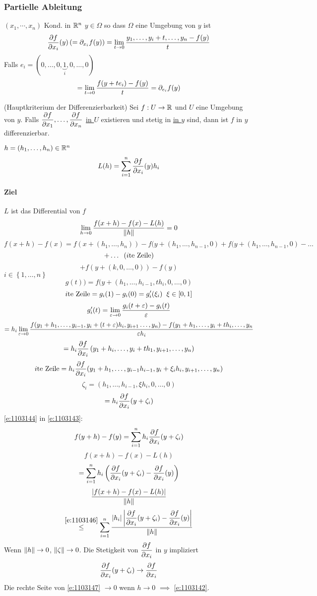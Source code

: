 \subsubsection{Partielle Ableitung}
$(x_1,\cdots,x_n)$ Kond. in $\mathbb{R}^n$ $y\in \Omega$ so dass $\Omega$ eine Umgebung von $y$ ist
\[\dfrac{\partial f}{\partial x_i}(y)\left( =\partial_{x_i}f(y) \right)=\displaystyle\lim_{t\rightarrow0}\frac{y_1,\dots,y_i+t,\dots,y_n-f(y)}{t}\]
Falls $e_i=(0,\dots,0,\underbrace{1}_i,0,\dots,0)$
\[=\displaystyle\lim_{t\rightarrow0}\frac{f(y+te_i)-f(y)}{t}=\partial_{e_i}f(y)\]
\begin{Sat}
  (Hauptkriterium der Differenzierbarkeit) Sei $f:U\rightarrow \mathbb{R}$ und $U$ eine Umgebung von $y$. Falls $\dfrac{\partial f}{\partial x_1},\dots,\dfrac{\partial f}{\partial x_n}$ \ul{in $U$} existieren und stetig in \ul{in $y$} sind, dann ist $f$ in $y$ differenzierbar.
\end{Sat}
\begin{Bew}
  $h=(h_1,\dots,h_n)\in\mathbb{R}^n$
  \[L(h)=\sum^n_{i=1}\dfrac{\partial f}{\partial x_i}(y)h_i\]
  \paragraph{Ziel} $L$ ist das Differential von $f$
  \[\displaystyle\lim_{h\rightarrow0}\frac{f(x+h)-f(x)-L(h)}{\left\| h \right\|}=0\]
  \[f(x+h)-f(x)=f(x+(h_1,\dots,h_n))-f(y+(h_1,\dots,h_{n-1},0)+f(y+(h_1,\dots,h_{n-1}, 0)-\dots\]
  \[+\dots\hspace{2mm}(\text{$i$te Zeile})\]
  \begin{equation}
    \label{e:1103143}
    +f(y+(k,0,\dots,0))-f(y)
  \end{equation}
  $i\in\left\{ 1,\dots,n \right\}$
  \[g(t))=f(y+(h_1,\dots,h_{i-1},th_i,0,\dots,0)\]
  \[\text{$i$te Zeile}=g_i(1)-g_i(0)=g_i'(\xi_i)\hspace{2mm}\xi\in \left[ 0,1 \right]\]
  \[g_i'(t)=\displaystyle\lim_{\varepsilon\rightarrow0}\frac{g_i(t+\varepsilon)-g_i(t)}{\varepsilon}\]
  \[=h_i\displaystyle\lim_{\varepsilon\rightarrow0}\frac{f(y_1+h_1,\dots,y_{i-1},y_i+(t+\varepsilon)h_i,y_{i+1}\dots,y_n)-f(y_1+h_1,\dots,y_i+th_i,\dots,y_n}{\varepsilon h_i}\]
  \[=h_i\dfrac{\partial f}{\partial x_i}\left( y_1+h_i,\dots,y_i+th_1,y_{i+1},\dots,y_n \right)\]
  \[\text{$i$te Zeile}=h_i\dfrac{\partial f}{\partial x_i}(y_1+h_1,\dots,y_{i-1}h_{i-1},y_i+\xi_ih_i,y_{i+1},\dots,y_n)\]
  \[\zeta_i=\left( h_1,\dots,h_{i-1},\xi h_i,0,\dots,0 \right)\]
  \begin{equation}
    \label{e:1103144}
    =h_i\dfrac{\partial f}{\partial x_i}(y+\zeta_i)
  \end{equation}
  \ref{e:1103144} in \ref{e:1103143}:
  \begin{equation}
    \label{e:1103145}
    f(y+h)-f(y)=\sum_{i=1}^nh_i\dfrac{\partial f}{\partial x_i}(y+\zeta_i)
  \end{equation}
  \[f(x+h)-f(x)-L(h)\]
  \begin{equation}
    \label{e:1103146}
    =\sum_{i=1}^nh_i\left( \dfrac{\partial f}{\partial x_i}(y+\zeta_i)-\dfrac{\partial f}{\partial x_i}(y) \right)
  \end{equation}
  \[\frac{\left| f(x+h)-f(x)-L(h) \right|}{\left\| h \right\|}\]
  \begin{equation}
    \label{e:1103147}
    \stackrel{\ref{e:1103146}}{\leq}\sum_{i=1}^n\frac{\left| h_i \right|\left| \dfrac{\partial f}{\partial x_i}(y+\zeta_i)-\dfrac{\partial f}{\partial x_i}(y) \right|}{\left\| h \right\|}
  \end{equation}
  Wenn $\left\| h \right\|\rightarrow 0$, $\left\| \zeta \right\|\rightarrow 0$. Die Stetigkeit von $\dfrac{\partial f}{\partial x_i}$ in $y$ impliziert
  \[\dfrac{\partial f}{\partial x_i}(y+\zeta_i)\rightarrow\dfrac{\partial f}{\partial x_i}\]
  Die rechte Seite von \ref{e:1103147} $\to 0$ wenn $h\to 0$ $\implies$ \ref{e:1103142}.
\end{Bew}
